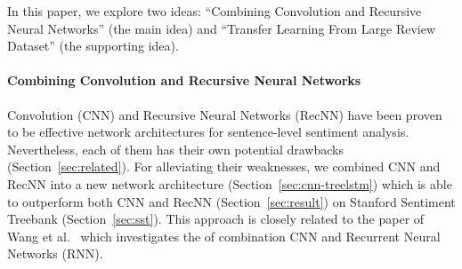 In this paper, we explore two ideas: ``Combining Convolution and Recursive Neural Networks'' (the main idea) and ``Transfer Learning From Large Review Dataset'' (the supporting idea).
\paragraph{Combining Convolution and Recursive Neural Networks} Convolution (CNN) and Recursive Neural Networks (RecNN) have been proven to be effective network architectures for sentence-level sentiment analysis.
Nevertheless, each of them has their own potential drawbacks (Section~\ref{sec:related}).
For alleviating their weaknesses, we combined CNN and RecNN into a new network architecture (Section~\ref{sec:cnn-treelstm}) which is able to outperform both CNN and RecNN (Section~\ref{sec:result}) on Stanford Sentiment Treebank (Section~\ref{sec:sst}).
This approach is closely related to the paper of Wang et al.~\cite{cnn-rnn} which investigates the of combination CNN and Recurrent Neural Networks (RNN).
